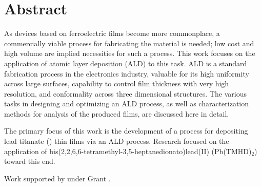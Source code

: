 \newpage
\chapter*{Abstract}


\noindent {}

As devices based on ferroelectric films become more commonplace, a commercially viable process for fabricating the material is needed; low cost and high volume are implied necessities for such a process. This work focuses on the application of atomic layer deposition (ALD) to this task. ALD is a standard fabrication process in the electronics industry, valuable for its high uniformity across large surfaces, capability to control film thickness with very high resolution, and conformality across three dimensional structures. The various tasks in designing and optimizing an ALD process, as well as characterization methods for analysis of the produced films, are discussed here in detail.

The primary focus of this work is the development of a process for depositing lead titanate () thin films via an ALD process. Research focused on the application of bis(2,2,6,6-tetramethyl-3,5-heptanedionato)lead(II) (Pb(TMHD)$_{2}$) toward this end. 

Work supported by  under Grant .